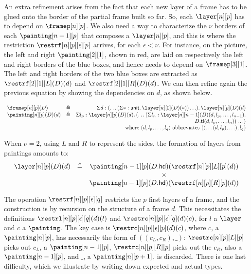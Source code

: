 \documentclass{msc}
\newcommand{\unittype}{\ensuremath{\mathsf{unit}}}
\newcommand{\unitpoint}{\ensuremath{\ast}}
\newcommand{\defeq}{\ensuremath{\triangleq}}
\newcommand{\tl}{\ensuremath{\mathsf{tl}}}
\newcommand{\hd}{\ensuremath{\mathsf{hd}}}
\begin{document}
An extra refinement arises from the fact that each new layer of a frame has to be glued onto the border of the partial frame built so far. So, each $\layer[n][p]$ has to depend on $\framep[n][p]$. We also need a way to characterize the $\nu$ borders of each $\painting[n-1][p]$ that composes a $\layer[n][p]$, and this is where the restriction $\restrf[n][p][\epsilon][p]$ arrives, for each $\epsilon < \nu$. For instance, on the picture, the left and right $\painting[2][1]$, shown in red, are laid on respectively the left and right borders of the blue boxes, and hence needs to depend on $\framep[3][1]$. The left and right borders of the two blue boxes are extracted as $\restrf[2][1][L](D)(d)$ and $\restrf[2][1][R](D)(d)$. We can then refine again the previous equation by showing the dependencies on $d$, as shown below.

\begin{equation*}
  \begin{array}{llr}
    \framep[n][p](D)      & \defeq & \Sigma d: (\ldots (\Sigma \unitpoint: \unittype.\, \layer[n][0](D)(\unitpoint)) \ldots).\, \layer[n][p](D)(d) \\
    \painting[n][p](D)(d) & \defeq & \Sigma l_p: \layer[n][p](D)(d).\, (\ldots (\Sigma l_n: \layer[n][n - 1](D)(d, l_p, \ldots, l_{n - 1}).        \\
                          &        & D.\tl(d, l_p, \ldots, l_n)) \ldots)                                                                           \\
                          &        & \text{where } (d, l_p, \ldots, l_q) \text{ abbreviates } ((\ldots(d, l_p), \ldots), l_q)
  \end{array}
\end{equation*}

When $\nu = 2$, using $L$ and $R$ to represent the sides, the formation of layers from paintings amounts to:
\begin{equation*}
  \begin{array}{llc}
    \layer[n][p](D)(d) & \defeq & \painting[n-1][p](D.\hd)(\restrf[n][p][L][p](d)) \\
                       &        & \times                                           \\
                       &        & \painting[n-1][p](D.\hd)(\restrf[n][p][R][p](d))
  \end{array}
\end{equation*}

The operation $\restrf[n][p][\epsilon][q]$ restricts the $p$ first layers of a frame, and the construction is by recursion on the structure of a frame $d$. This necessitates the definitions $\restrl[n][p][\epsilon][q](d)(l)$ and $\restrc[n][p][\epsilon][q](d)(c)$, for $l$ a $\layer$ and $c$ a $\painting$. The key case is $\restrc[n][p][\epsilon][p](d)(c)$, where $c$, a $\painting[n][p]$, has necessarily the form of $((c_L, c_R), \_)$: $\restrc[n][p][L][p]$ picks out $c_L$, a $\painting[n-1][p]$, $\restrc[n][p][R][p]$ picks out the $c_R$, also a $\painting[n-1][p]$, and $\_$, a $\painting[n][p+1]$, is discarded. There is one last difficulty, which we illustrate by writing down expected and actual types.
\end{document}
